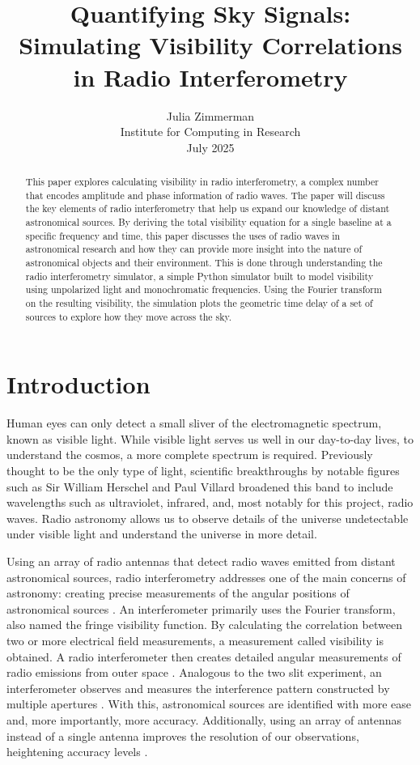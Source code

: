 \documentclass[12pt]{article}
\title{\textbf{
Quantifying Sky Signals: Simulating Visibility Correlations in Radio Interferometry
}}
\author{Julia Zimmerman\\Institute for Computing in Research\\July 2025}
\date{}
\begin{document}
\maketitle

\begin{abstract}
This paper explores calculating visibility in radio interferometry, a complex number that encodes amplitude and phase information of radio waves. The paper will discuss the key elements of radio interferometry that help us expand our knowledge of distant astronomical sources. By deriving the total visibility equation for a single baseline at a specific frequency and time, this paper discusses the uses of radio waves in astronomical research and how they can provide more insight into the nature of astronomical objects and their environment. This is done through understanding the radio interferometry simulator, a simple Python simulator built to model visibility using unpolarized light and monochromatic frequencies. Using the Fourier transform on the resulting visibility, the simulation plots the geometric time delay of a set of sources to explore how they move across the sky. 
\end{abstract}

\section{Introduction}

    Human eyes can only detect a small sliver of the electromagnetic spectrum, known as visible light. While visible light serves us well in our day-to-day lives, to understand the cosmos, a more complete spectrum is required. Previously thought to be the only type of light, scientific breakthroughs by notable figures such as Sir William Herschel and Paul Villard \cite{[2]} broadened this band to include wavelengths such as ultraviolet, infrared, and, most notably for this project, radio waves. Radio astronomy allows us to observe details of the universe undetectable under visible light and understand the universe in more detail. 

    Using an array of radio antennas that detect radio waves emitted from distant astronomical sources, radio interferometry addresses one of the main concerns of astronomy: creating precise measurements of the angular positions of astronomical sources \cite{[1]}. An interferometer primarily uses the Fourier transform, also named the fringe visibility function. By calculating the correlation between two or more electrical field measurements, a measurement called visibility is obtained. A radio interferometer then creates detailed angular measurements of radio emissions from outer space \cite{[1]}. Analogous to the two slit experiment, an interferometer observes and measures the interference pattern constructed by multiple apertures \cite{[3]}. With this, astronomical sources are identified with more ease and, more importantly, more accuracy. Additionally, using an array of antennas instead of a single antenna improves the resolution of our observations, heightening accuracy levels \cite{[1]}. 
\end{document}
